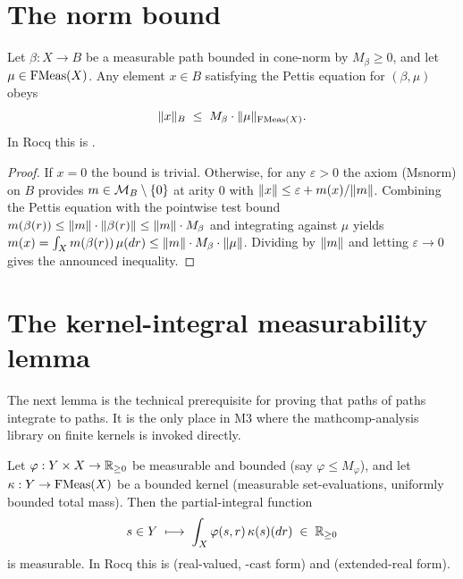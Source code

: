 \section{The norm bound}\label{sec:integral-norm-bound}

\begin{lemma}\label{lem:path-integral-norm-le}
Let $\beta : X \to B$ be a measurable path bounded in cone-norm by
$M_\beta \geq 0$, and let $\mu \in \mathrm{FMeas}(X)$. Any element $x \in B$
satisfying the Pettis equation for $(\beta, \mu)$ obeys
\[
  \lVert x \rVert_B \;\leq\; M_\beta \cdot \lVert \mu \rVert_{\mathrm{FMeas}(X)}.
\]
In Rocq this is .
\rocqok
\end{lemma}

\begin{proof}
If $x = 0$ the bound is trivial. Otherwise, for any $\varepsilon > 0$
the axiom (Msnorm) on $B$ provides $m \in \mathcal{M}_B \setminus \{0\}$
at arity $0$ with $\lVert x \rVert \leq \varepsilon + m(x)/\lVert m \rVert$.
Combining the Pettis equation with the pointwise test bound
$m(\beta(r)) \leq \lVert m \rVert \cdot \lVert \beta(r) \rVert \leq
\lVert m \rVert \cdot M_\beta$ and integrating against $\mu$ yields
$m(x) = \int_X m(\beta(r))\,\mu(dr) \leq \lVert m \rVert \cdot M_\beta
\cdot \lVert \mu \rVert$. Dividing by $\lVert m \rVert$ and letting
$\varepsilon \to 0$ gives the announced inequality.
\end{proof}

\section{The kernel-integral measurability lemma}\label{sec:lemma46}

The next lemma is the technical prerequisite for proving that paths
of paths integrate to paths. It is the only place in M3 where the
mathcomp-analysis library on finite kernels is invoked directly.

\begin{lemma}\label{lem:kernel-integral-measurable}
Let $\varphi : Y \times X \to \mathbb{R}_{\geq 0}$ be measurable and bounded
(say $\varphi \leq M_\varphi$), and let $\kappa : Y \to \mathrm{FMeas}(X)$
be a bounded kernel (measurable set-evaluations, uniformly bounded
total mass). Then the partial-integral function
\[
  s \in Y \;\longmapsto\; \int_X \varphi(s, r)\,\kappa(s)(dr) \;\in\;
  \mathbb{R}_{\geq 0}
\]
is measurable. In Rocq this is
(real-valued, \fine{}-cast form) and
(extended-real form). \rocqok
\end{lemma}

